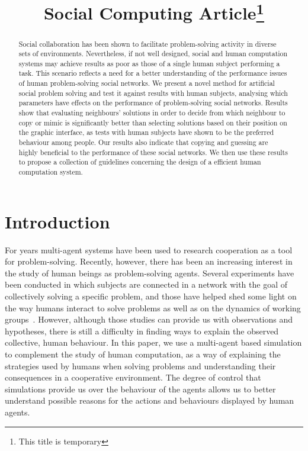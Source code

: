 \documentclass{article}
\title{Social Computing Article\thanks{This title is temporary}}
\begin{document}
\maketitle

\begin{abstract}
Social collaboration has been shown to facilitate problem-solving activity in diverse sets of environments. Nevertheless, if not well designed, social and human computation systems may achieve results as poor as those of a single human subject performing a task. This scenario reflects a need for a better understanding of the performance issues of human problem-solving social networks. We present a novel method for artificial social problem solving and test it against results with human subjects, analysing which parameters have effects on the performance of problem-solving social networks. Results show that evaluating neighbours' solutions in order to decide from which neighbour to copy or mimic is significantly better than selecting solutions based on their position on the graphic interface, as tests with human subjects have shown to be the preferred behaviour among people. Our results also indicate that copying and guessing are highly beneficial to the performance of these social networks. We then use these results to propose a collection of guidelines concerning the design of a efficient human computation system.
\end{abstract}

\section{Introduction}

For years multi-agent systems have been used to research cooperation as a tool for problem-solving. %
Recently, however, there has been an increasing interest in the study of human beings as problem-solving agents. Several experiments have been conducted in which subjects are connected in a network with the goal of collectively solving a specific problem, and those have helped shed some light on the way humans interact to solve problems as well as on the dynamics of working groups~\cite{woolley:evidencecollective}. However, although those studies can provide us with observations and hypotheses, there is still a difficulty in finding ways to explain the observed collective, human behaviour. In this paper, we use a multi-agent based simulation to complement %
the study of human computation, as a way of explaining the strategies used by humans when solving problems and understanding their consequences in a cooperative environment. The degree of control that simulations provide us over the behaviour of the agents allows us to better understand possible reasons for the actions and behaviours displayed by human agents.
\end{document}
